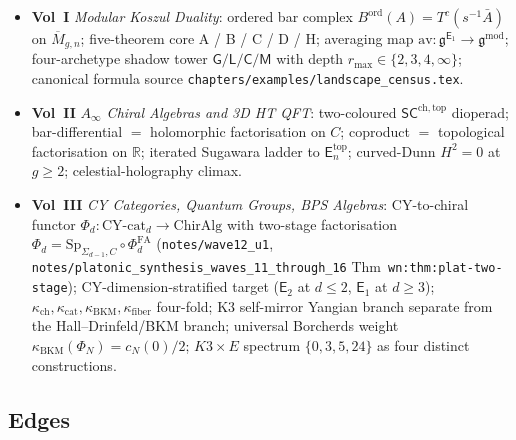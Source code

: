 \documentclass[11pt]{article}
\theoremstyle{definition}
\theoremstyle{remark}
\providecommand{\R}{\mathbb{R}}
\providecommand{\fg}{\mathfrak{g}}
\providecommand{\ChirAlg}{\mathrm{ChirAlg}}
\providecommand{\CYcat}{\mathrm{CY}\text{-}\mathrm{cat}}
\providecommand{\Sp}{\mathrm{Sp}}
\providecommand{\Phifa}{\Phi^{\mathrm{FA}}}
\providecommand{\Eone}{\mathsf{E}_1}
\providecommand{\Etwo}{\mathsf{E}_2}
\providecommand{\En}{\mathsf{E}_n}
\providecommand{\kch}{\kappa_{\mathrm{ch}}}
\providecommand{\kcat}{\kappa_{\mathrm{cat}}}
\providecommand{\kBKM}{\kappa_{\mathrm{BKM}}}
\providecommand{\kfib}{\kappa_{\mathrm{fiber}}}
\begin{document}
\begin{itemize}[leftmargin=1.5em]
\item \textbf{Vol~I} \emph{Modular Koszul Duality}: ordered bar complex
$B^{\mathrm{ord}}(A) = T^c(s^{-1}\bar A)$ on $\overline{M}_{g,n}$;
five-theorem core A / B / C / D / H; averaging map
$\mathrm{av}\colon \fg^{\Eone}\to\fg^{\mathrm{mod}}$; four-archetype
shadow tower $\mathsf{G}/\mathsf{L}/\mathsf{C}/\mathsf{M}$ with
depth $r_{\max}\in\{2,3,4,\infty\}$; canonical formula source
\texttt{chapters/examples/landscape\_census.tex}.
\item \textbf{Vol~II} \emph{$A_\infty$ Chiral Algebras and 3D HT QFT}:
two-coloured $\mathsf{SC}^{\mathrm{ch,top}}$ dioperad; bar-differential
$=$ holomorphic factorisation on $C$; coproduct $=$ topological
factorisation on $\R$; iterated Sugawara ladder to
$\En^{\mathrm{top}}$; curved-Dunn $H^2 = 0$ at $g\geq 2$;
celestial-holography climax.
\item \textbf{Vol~III} \emph{CY Categories, Quantum Groups, BPS Algebras}:
CY-to-chiral functor $\Phi_d\colon\CYcat_d\to\ChirAlg$ with two-stage
factorisation $\Phi_d = \Sp_{\Sigma_{d-1},C}\circ\Phifa_d$
(\texttt{notes/wave12\_u1}, \texttt{notes/platonic\_synthesis\_waves\_11\_through\_16}
Thm~\texttt{wn:thm:plat-two-stage}); CY-dimension-stratified target
($\Etwo$ at $d\leq 2$, $\Eone$ at $d\geq 3$);
$\kch,\kcat,\kBKM,\kfib$ four-fold; K3 self-mirror Yangian branch
separate from the Hall--Drinfeld/BKM branch; universal Borcherds
weight $\kBKM(\Phi_N) = c_N(0)/2$; $K3\times E$ spectrum
$\{0,3,5,24\}$ as four distinct constructions.
\end{itemize}

\subsection{Edges}
\end{document}
